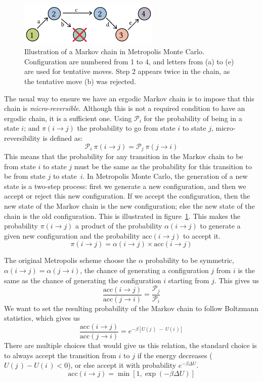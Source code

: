 \documentclass[thesis]{subfiles}
\begin{document}
\begin{figure}[t]
    \centering
    \includegraphics[width=0.6\textwidth]{figures/images/mc-chain}
    \caption{Illustration of a Markov chain in Metropolis Monte Carlo.
    Configuration are numbered from 1 to 4, and letters from (a) to (e) are used
    for tentative moves. Step 2 appears twice in the chain, as the tentative
    move (b) was rejected.}
    \label{fig:mc:chain}
\end{figure}

The usual way to ensure we have an ergodic Markov chain is to impose that this
chain is \emph{micro-reversible}. Although this is not a required condition to
have an ergodic chain, it is a sufficient one\cite{Frenkel1997}. Using
$\mathcal{P}_i$ for the probability of being in a state $i$; and $\pi(i \to j)$
the probability to go from state $i$ to state $j$, micro-reversibility is
defined as:
\[ \mathcal{P}_i \ \pi(i \to j) = \mathcal{P}_j \ \pi(j \to i)\]
This means that the probability for any transition in the Markov chain to be
from state $i$ to state $j$ must be the same as the probability for this
transition to be from state $j$ to state~$i$. In Metropolis Monte Carlo, the
generation of a new state is a two-step process: first we generate a new
configuration, and then we accept or reject this new configuration. If we accept
the configuration, then the new state of the Markov chain is the new
configuration; else the new state of the chain is the old configuration. This is
illustrated in figure~\ref{fig:mc:chain}. This makes the probability $\pi(i \to
j)$ a product of the probability $\alpha(i \to j)$ to generate a given new
configuration and the probability $\text{acc}(i \to j)$ to accept it.
\[\pi(i \to j) = \alpha(i \to j)\times\text{acc}(i \to j)\]

The original Metropolis scheme\cite{Metropolis1953} choose the $\alpha$
probability to be symmetric, \ie $\alpha(i \to j) = \alpha(j \to i)$, the chance
of generating a configuration $j$ from $i$ is the same as the chance of
generating the configuration $i$ starting from $j$. This gives us
\[ \frac{\text{acc}(i \to j)}{\text{acc}(j \to i)} = \frac{\mathcal{P}_j}{\mathcal{P}_i} \label{eq:mc:acceptance}\]
We want to set the resulting probability of the Markov chain to follow Boltzmann
statistics, which gives us
\[ \frac{\text{acc}(i \to j)}{\text{acc}(j \to i)} = e^{-\beta [U(j\,) \;-\; U(i\,)]} \]
There are multiple choices that would give us this relation, the standard choice
is to always accept the transition from $i$ to $j$ if the energy decreases
($U(j\,) - U(i\,) < 0$), or else accept it with probability $e^{-\beta \Delta U}$.
\[\text{acc}(i \to j) = \min\left[1, \exp\left(-\beta \Delta U\right)\right] \label{eq:mc:acceptance:nvt}\]
\end{document}
